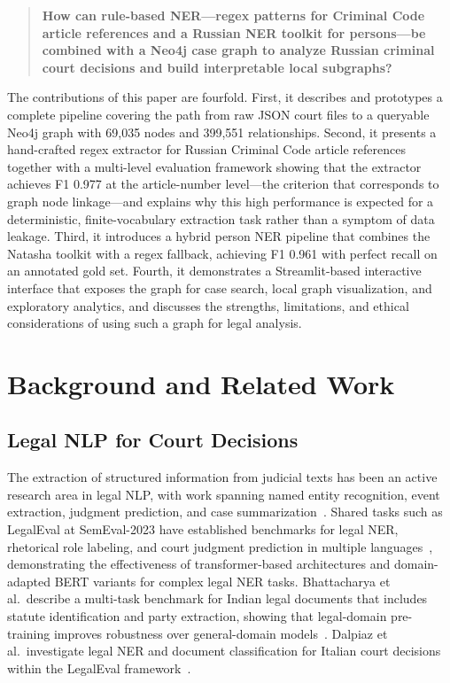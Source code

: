 \documentclass[11pt]{article}
\begin{document}
\begin{quote}
\textbf{How can rule-based NER---regex patterns for Criminal Code article references and a Russian NER toolkit for persons---be combined with a Neo4j case graph to analyze Russian criminal court decisions and build interpretable local subgraphs?}
\end{quote}

The contributions of this paper are fourfold. First, it describes and prototypes a complete pipeline covering the path from raw JSON court files to a queryable Neo4j graph with 69{,}035 nodes and 399{,}551 relationships. Second, it presents a hand-crafted regex extractor for Russian Criminal Code article references together with a multi-level evaluation framework showing that the extractor achieves F1 0.977 at the article-number level---the criterion that corresponds to graph node linkage---and explains why this high performance is expected for a deterministic, finite-vocabulary extraction task rather than a symptom of data leakage. Third, it introduces a hybrid person NER pipeline that combines the Natasha toolkit with a regex fallback, achieving F1 0.961 with perfect recall on an annotated gold set. Fourth, it demonstrates a Streamlit-based interactive interface that exposes the graph for case search, local graph visualization, and exploratory analytics, and discusses the strengths, limitations, and ethical considerations of using such a graph for legal analysis.

\section{Background and Related Work}

\subsection{Legal NLP for Court Decisions}

The extraction of structured information from judicial texts has been an active research area in legal NLP, with work spanning named entity recognition, event extraction, judgment prediction, and case summarization~\cite{Chalkidis2019Deep,Avdievska2023Survey}. Shared tasks such as LegalEval at SemEval-2023 have established benchmarks for legal NER, rhetorical role labeling, and court judgment prediction in multiple languages~\cite{Modi2023LegalEval}, demonstrating the effectiveness of transformer-based architectures and domain-adapted BERT variants for complex legal NER tasks. Bhattacharya et al.\ describe a multi-task benchmark for Indian legal documents that includes statute identification and party extraction, showing that legal-domain pre-training improves robustness over general-domain models~\cite{Bhattacharya2019Rhetorical}. Dalpiaz et al.\ investigate legal NER and document classification for Italian court decisions within the LegalEval framework~\cite{dalpiaz2023legalner}. 
\end{document}
